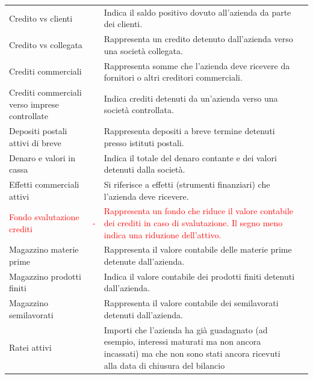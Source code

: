 \documentclass{article}
\newcommand{\CreditoVsClienti}{Indica il saldo positivo dovuto all'azienda da parte dei clienti.}
\newcommand{\CreditoVsCollegata}{Rappresenta un credito detenuto dall'azienda verso una società collegata.}
\newcommand{\CreditiCommerciali}{Rappresenta somme che l'azienda deve ricevere da fornitori o altri creditori commerciali.}
\newcommand{\CreditiCommercialiVsImpreseControllate}{Indica crediti detenuti da un'azienda verso una società controllata.}
\newcommand{\DepositiPostaliAttiviBreve}{Rappresenta depositi a breve termine detenuti presso istituti postali.}
\newcommand{\DenaroValoriCassa}{Indica il totale del denaro contante e dei valori detenuti dalla società.}
\newcommand{\EffettiCommercialiAttivi}{Si riferisce a effetti (strumenti finanziari) che l'azienda deve ricevere.}
\newcommand{\FondoSvalutazioneCrediti}{Rappresenta un fondo che riduce il valore contabile dei crediti in caso di svalutazione. Il segno meno indica una riduzione dell'attivo.}
\newcommand{\MagazzinoMateriePrime}{Rappresenta il valore contabile delle materie prime detenute dall'azienda.}
\newcommand{\MagazzinoProdottiFiniti}{Indica il valore contabile dei prodotti finiti detenuti dall'azienda.}
\newcommand{\MagazzinoSemilavorati}{Rappresenta il valore contabile dei semilavorati detenuti dall'azienda.}
\newcommand{\RateiAttivi}{Importi che l'azienda ha già guadagnato (ad esempio, interessi maturati ma non ancora incassati) ma che non sono stati ancora ricevuti alla data di chiusura del bilancio}
\begin{document}
\begin{table}[ht]
{\begin{tabular}{|l|c|l|c|}
            Credito vs clienti                                                              &                    & \CreditoVsClienti                                 &                 \\
            Credito vs collegata                                                            &                    & \CreditoVsCollegata                               &                 \\
            Crediti commerciali                                                             &                    & \CreditiCommerciali                               &                 \\
            Crediti commerciali verso imprese controllate                                   &                    & \CreditiCommercialiVsImpreseControllate           &                 \\
            Depositi postali attivi di breve                                                &                    & \DepositiPostaliAttiviBreve                       &                 \\
            Denaro e valori in cassa                                                        &                    & \DenaroValoriCassa                                &                 \\
            Effetti commerciali attivi                                                      &                    & \EffettiCommercialiAttivi                         &                 \\
            \textcolor{red}{Fondo svalutazione crediti}                                     & \textcolor{red}{-} & \textcolor{red}{\FondoSvalutazioneCrediti}        &                 \\
            Magazzino materie prime                                                         &                    & \MagazzinoMateriePrime                            &                 \\
            Magazzino prodotti finiti                                                       &                    & \MagazzinoProdottiFiniti                          &                 \\
            Magazzino semilavorati                                                          &                    & \MagazzinoSemilavorati                            &                 \\
            Ratei attivi                                                                    &                    & \RateiAttivi                                      &                 \\

\end{tabular}}
\end{table}
\end{document}
